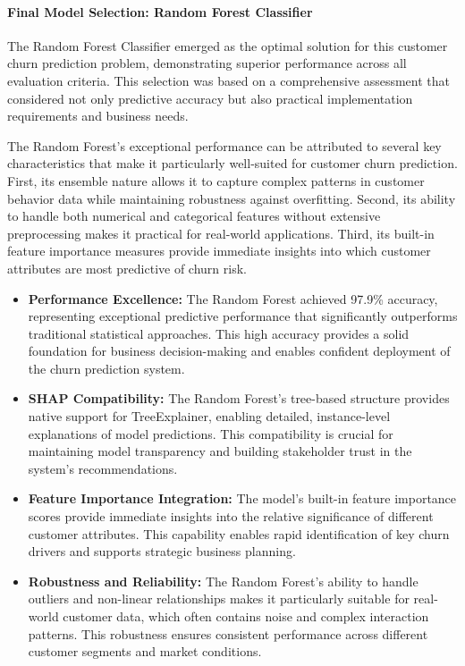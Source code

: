 \documentclass{article}
\begin{document}
\paragraph{Final Model Selection: Random Forest Classifier}

The Random Forest Classifier emerged as the optimal solution for this customer churn prediction problem, demonstrating superior performance across all evaluation criteria. This selection was based on a comprehensive assessment that considered not only predictive accuracy but also practical implementation requirements and business needs.

The Random Forest's exceptional performance can be attributed to several key characteristics that make it particularly well-suited for customer churn prediction. First, its ensemble nature allows it to capture complex patterns in customer behavior data while maintaining robustness against overfitting. Second, its ability to handle both numerical and categorical features without extensive preprocessing makes it practical for real-world applications. Third, its built-in feature importance measures provide immediate insights into which customer attributes are most predictive of churn risk.

\begin{itemize}
    \item \textbf{Performance Excellence:} The Random Forest achieved 97.9\% accuracy, representing exceptional predictive performance that significantly outperforms traditional statistical approaches. This high accuracy provides a solid foundation for business decision-making and enables confident deployment of the churn prediction system.
    
    \item \textbf{SHAP Compatibility:} The Random Forest's tree-based structure provides native support for TreeExplainer, enabling detailed, instance-level explanations of model predictions. This compatibility is crucial for maintaining model transparency and building stakeholder trust in the system's recommendations.
    
    \item \textbf{Feature Importance Integration:} The model's built-in feature importance scores provide immediate insights into the relative significance of different customer attributes. This capability enables rapid identification of key churn drivers and supports strategic business planning.
    
    \item \textbf{Robustness and Reliability:} The Random Forest's ability to handle outliers and non-linear relationships makes it particularly suitable for real-world customer data, which often contains noise and complex interaction patterns. This robustness ensures consistent performance across different customer segments and market conditions.
\end{itemize}
\end{document}
